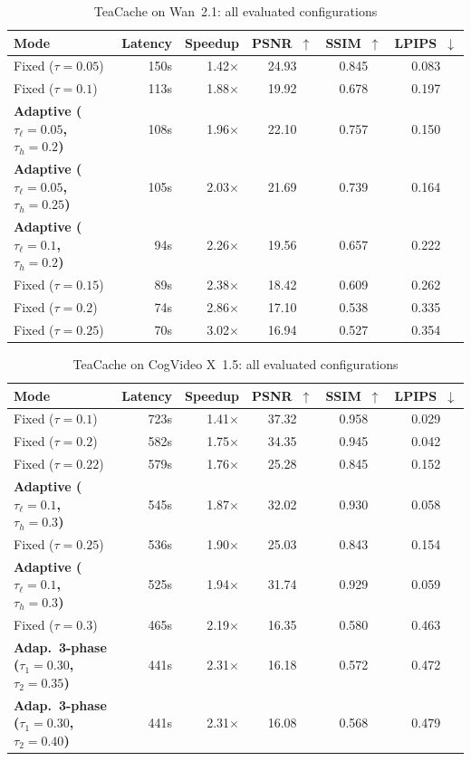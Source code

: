 \documentclass{article}
\begin{document}
\begin{table}[htbp]
\centering
\small
\setlength{\tabcolsep}{5pt}
\caption{TeaCache on Wan~2.1: all evaluated configurations}
\label{tab:app-tc-wan}
\begin{tabular}{lrrccc}
\toprule
\textbf{Mode} & \textbf{Latency} & \textbf{Speedup} & \textbf{PSNR~$\uparrow$} & \textbf{SSIM~$\uparrow$} & \textbf{LPIPS~$\downarrow$} \\
\midrule
  Fixed ($\tau=0.05$) & 150s & 1.42$\times$ & 24.93 & 0.845 & 0.083 \\
  Fixed ($\tau=0.1$) & 113s & 1.88$\times$ & 19.92 & 0.678 & 0.197 \\
  \textbf{Adaptive ($\tau_\ell=0.05$, $\tau_h=0.2$)} & 108s & 1.96$\times$ & 22.10 & 0.757 & 0.150 \\
  \textbf{Adaptive ($\tau_\ell=0.05$, $\tau_h=0.25$)} & 105s & 2.03$\times$ & 21.69 & 0.739 & 0.164 \\
  \textbf{Adaptive ($\tau_\ell=0.1$, $\tau_h=0.2$)} & 94s & 2.26$\times$ & 19.56 & 0.657 & 0.222 \\
  Fixed ($\tau=0.15$) & 89s & 2.38$\times$ & 18.42 & 0.609 & 0.262 \\
  Fixed ($\tau=0.2$) & 74s & 2.86$\times$ & 17.10 & 0.538 & 0.335 \\
  Fixed ($\tau=0.25$) & 70s & 3.02$\times$ & 16.94 & 0.527 & 0.354 \\
\bottomrule
\end{tabular}
\end{table}

\begin{table}[htbp]
\centering
\small
\setlength{\tabcolsep}{5pt}
\caption{TeaCache on CogVideo X~1.5: all evaluated configurations}
\label{tab:app-tc-cog}
\begin{tabular}{lrrccc}
\toprule
\textbf{Mode} & \textbf{Latency} & \textbf{Speedup} & \textbf{PSNR~$\uparrow$} & \textbf{SSIM~$\uparrow$} & \textbf{LPIPS~$\downarrow$} \\
\midrule
  Fixed ($\tau=0.1$) & 723s & 1.41$\times$ & 37.32 & 0.958 & 0.029 \\
  Fixed ($\tau=0.2$) & 582s & 1.75$\times$ & 34.35 & 0.945 & 0.042 \\
  Fixed ($\tau=0.22$) & 579s & 1.76$\times$ & 25.28 & 0.845 & 0.152 \\
  \textbf{Adaptive ($\tau_\ell=0.1$, $\tau_h=0.3$)} & 545s & 1.87$\times$ & 32.02 & 0.930 & 0.058 \\
  Fixed ($\tau=0.25$) & 536s & 1.90$\times$ & 25.03 & 0.843 & 0.154 \\
  \textbf{Adaptive ($\tau_\ell=0.1$, $\tau_h=0.3$)} & 525s & 1.94$\times$ & 31.74 & 0.929 & 0.059 \\
  Fixed ($\tau=0.3$) & 465s & 2.19$\times$ & 16.35 & 0.580 & 0.463 \\
  \textbf{Adap.\ 3-phase ($\tau_1=0.30$, $\tau_2=0.35$)} & 441s & 2.31$\times$ & 16.18 & 0.572 & 0.472 \\
  \textbf{Adap.\ 3-phase ($\tau_1=0.30$, $\tau_2=0.40$)} & 441s & 2.31$\times$ & 16.08 & 0.568 & 0.479 \\
\bottomrule
\end{tabular}
\end{table}
\end{document}
